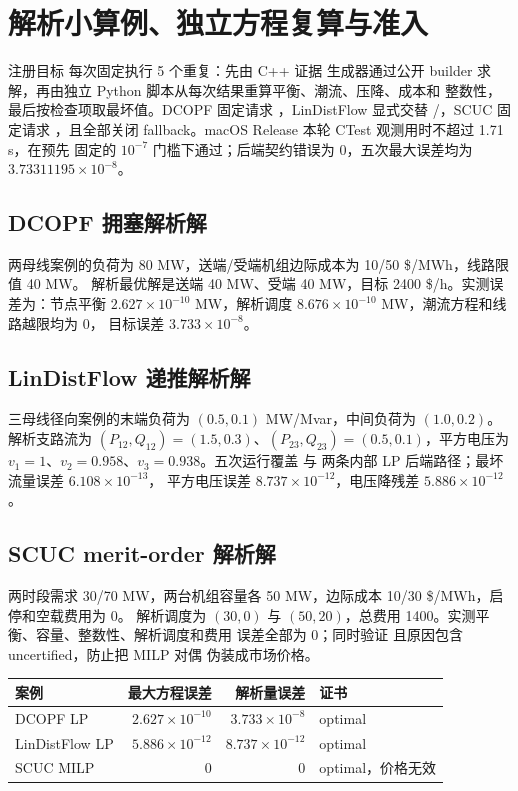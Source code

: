 \section{解析小算例、独立方程复算与准入}\label{sec:power-models-numerical}

注册目标  每次固定执行 5 个重复：先由 C++ 证据
生成器通过公开 builder 求解，再由独立 Python 脚本从每次结果重算平衡、潮流、压降、成本和
整数性，最后按检查项取最坏值。DCOPF 固定请求 ，LinDistFlow
显式交替 /，SCUC 固定请求
，且全部关闭 fallback。macOS Release 本轮 CTest 观测用时不超过 1.71 s，在预先
固定的 $10^{-7}$ 门槛下通过；后端契约错误为 0，五次最大误差均为
$3.73311195\times10^{-8}$。

\subsection{DCOPF 拥塞解析解}
两母线案例的负荷为 80 MW，送端/受端机组边际成本为 10/50 \$/MWh，线路限值 40 MW。
解析最优解是送端 40 MW、受端 40 MW，目标 2400 \$/h。实测误差为：节点平衡
$2.627\times10^{-10}$ MW，解析调度 $8.676\times10^{-10}$ MW，潮流方程和线路越限均为 0，
目标误差 $3.733\times10^{-8}$。

\subsection{LinDistFlow 递推解析解}
三母线径向案例的末端负荷为 $(0.5,0.1)$ MW/Mvar，中间负荷为 $(1.0,0.2)$。解析支路流为
$(P_{12},Q_{12})=(1.5,0.3)$、$(P_{23},Q_{23})=(0.5,0.1)$，平方电压为
$v_1=1$、$v_2=0.958$、$v_3=0.938$。五次运行覆盖  与
 两条内部 LP 后端路径；最坏流量误差 $6.108\times10^{-13}$，
平方电压误差 $8.737\times10^{-12}$，电压降残差 $5.886\times10^{-12}$。

\subsection{SCUC merit-order 解析解}
两时段需求 30/70 MW，两台机组容量各 50 MW，边际成本 10/30 \$/MWh，启停和空载费用为 0。
解析调度为 $(30,0)$ 与 $(50,20)$，总费用 1400。实测平衡、容量、整数性、解析调度和费用
误差全部为 0；同时验证  且原因包含 uncertified，防止把 MILP 对偶
伪装成市场价格。

\begin{center}\small
\begin{tabular}{@{}L{5.2cm}rrL{4.7cm}@{}}
\toprule 案例 & 最大方程误差 & 解析量误差 & 证书\\\midrule
DCOPF LP & $2.627\times10^{-10}$ & $3.733\times10^{-8}$ & optimal\\
LinDistFlow LP & $5.886\times10^{-12}$ & $8.737\times10^{-12}$ & optimal\\
SCUC MILP & 0 & 0 & optimal，价格无效\\
\bottomrule
\end{tabular}
\end{center}

